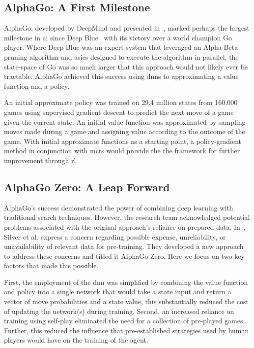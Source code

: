     \subsection*{AlphaGo: A First Milestone}

AlphaGo, developed by DeepMind and presented in~\cite{silver2016}, 
marked perhaps the largest milestone in \gls{ai} since Deep Blue~%
\cite{campbell2002} with its victory over a world champion Go player.
Where Deep Blue was an expert system that leveraged an Alpha-Beta pruning 
algorithm and \glspl{asic} designed to execute the algorithm in parallel,
the state-space of Go was so much larger that this approach would not 
likely ever be tractable. AlphaGo achieved this success using 
\glspl{dnn} to approximating a value function and a policy.

An initial approximate policy was trained on 29.4 million states 
from 160,000 games using supervised gradient descent to predict 
the next move of a game given the current state.
An initial value function was approximated by sampling moves made 
during a game and assigning value according to the outcome of the game.
%
With initial approximate functions as a starting point,
a policy-gradient method in conjunction with \gls{mcts}
would provide the the framework for further improvement through \gls{rl}.

    \subsection*{AlphaGo Zero: A Leap Forward}

AlphaGo's success demonstrated the power of combining deep learning with 
traditional search techniques. However, the research team acknowledged potential
problems associated with the original approach's reliance on prepared data. 
In~\cite{silver2017}, Silver et al. express a concern regarding possible 
expense, unreliability, or unavailability of relevant data for pre-training.
They developed a new approach to address these concerns and titled it 
AlphaGo Zero. Here we focus on two key factors that made this possible.

First, the employment of the \gls{dnn} was simplified by combining the 
value function and policy into a single network that would take a state 
input and return a vector of move probabilities and a state value, 
this substantially reduced the cost of updating the network(s) during training.
%
Second, an increased reliance on training using self-play
eliminated the need for a collection of pre-played games.
Further, this reduced the influence that pre-established strategies 
used by human players would have on the training of the agent.

